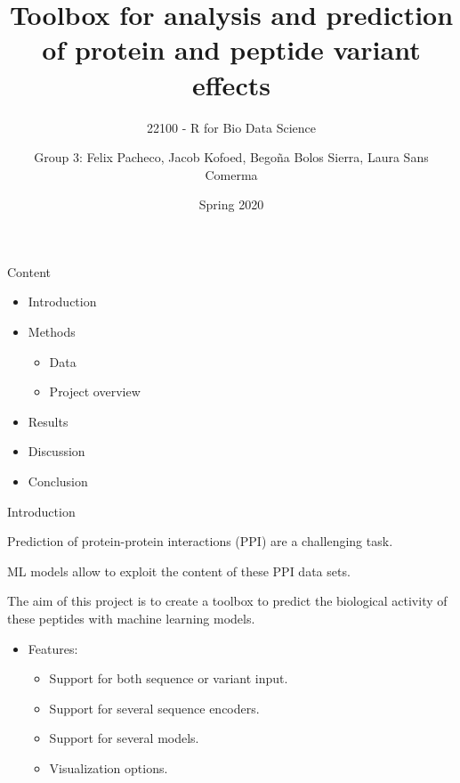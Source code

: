 \documentclass[ignorenonframetext,]{beamer}
\title{Toolbox for analysis and prediction of protein and peptide variant
effects}
\subtitle{22100 - R for Bio Data Science}
\author{Group 3: Felix Pacheco, Jacob Kofoed, Begoña Bolos Sierra, Laura Sans
Comerma}
\date{Spring 2020}
\providecommand{\tightlist}{%
  \setlength{\itemsep}{0pt}\setlength{\parskip}{0pt}}
\begin{document}
\frame{\titlepage}

\begin{frame}

\end{frame}

\begin{frame}{Content}
\protect\hypertarget{content}{}

\begin{itemize}
\tightlist
\item
  Introduction
\item
  Methods

  \begin{itemize}
  \tightlist
  \item
    Data
  \item
    Project overview
  \end{itemize}
\item
  Results
\item
  Discussion
\item
  Conclusion
\end{itemize}

\end{frame}

\begin{frame}{Introduction}
\protect\hypertarget{introduction}{}

Prediction of protein-protein interactions (PPI) are a challenging task.

ML models allow to exploit the content of these PPI data sets.

The aim of this project is to create a toolbox to predict the biological
activity of these peptides with machine learning models.

\begin{itemize}
\tightlist
\item
  Features:

  \begin{itemize}
  \tightlist
  \item
    Support for both sequence or variant input.
  \item
    Support for several sequence encoders.
  \item
    Support for several models.
  \item
    Visualization options.
  \end{itemize}
\end{itemize}

\end{frame}
\end{document}

